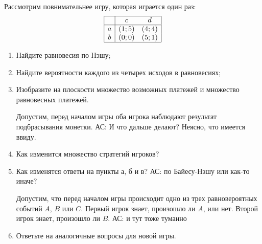 \begin{problem}

Рассмотрим повнимательнее игру, которая играется один раз:
\[\begin{array}{|c|cc|}  \hline {} & {c} & {d} \\  \hline {a} & {\left(1;5\right)} & {\left(4;4\right)} \\ {b} & {\left(0;0\right)} & {\left(5;1\right)} \\  \hline  \end{array}\]
\begin{enumerate}
\item Найдите равновесия по Нэшу;\par
\item Найдите вероятности каждого из четырех исходов в равновесиях;\par
\item  Изобразите на плоскости множество возможных платежей и множество равновесных платежей.\par
Допустим, перед началом игры оба игрока наблюдают результат подбрасывания монетки. {\red АС: И что дальше делают? Неясно, что имеется ввиду.}\par
\item Как изменится множество стратегий игроков?\par
\item Как изменятся ответы на пункты а, б и в? {\red АС: по Байесу-Нэшу или как-то иначе?} \par
Допустим, что перед началом игры происходит одно из трех равновероятных событий  $A$,  $B$  или  $C$. Первый игрок знает, произошло ли  $A$, или нет. Второй игрок знает, произошло ли  $B$. {\red АС: и тут тоже туманно}\par
\item Ответьте на аналогичные вопросы для новой игры.\par
\end{enumerate}


\begin{sol}

\end{sol}
\end{problem}



